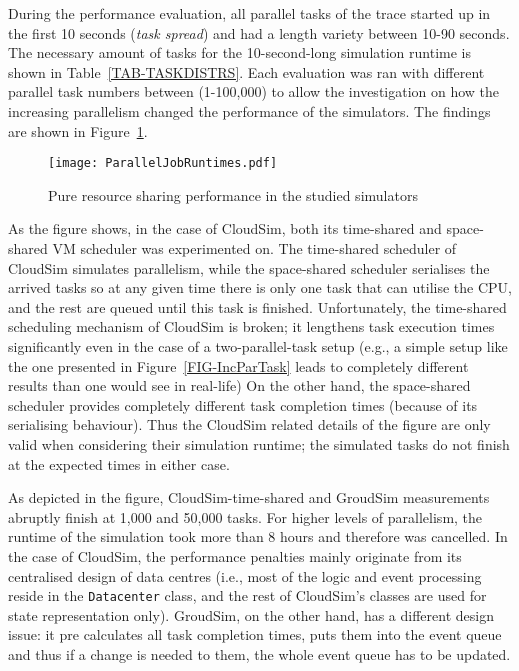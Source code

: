\documentclass[sort, compress, 5p]{elsarticle}
\begin{document}
During the performance evaluation, all parallel tasks of the trace started up in the first 10 seconds (\emph{task spread}) and had a length variety between 10-90 seconds. The necessary amount of tasks for the 10-second-long simulation runtime is shown in Table~\ref{TAB-TASKDISTRS}. Each evaluation was ran with different parallel task numbers between (1-100,000) to allow the investigation on how the increasing parallelism changed the performance of the simulators. The findings are shown in Figure~\ref{FIG-PJRuntime}.

\begin{figure}[tb]
\center
\texttt{[image: ParallelJobRuntimes.pdf]}
\caption{Pure resource sharing performance in the studied simulators\label{FIG-PJRuntime}}
\end{figure}

As the figure shows, in the case of CloudSim, both its time-shared and space-shared VM scheduler was experimented on. The time-shared scheduler of CloudSim simulates parallelism, while the space-shared scheduler serialises the arrived tasks so at any given time there is only one task that can utilise the CPU, and the rest are queued until this task is finished. Unfortunately, the time-shared scheduling mechanism of CloudSim is broken; it lengthens task execution times significantly even in the case of a two-parallel-task setup (e.g., a simple setup like the one presented in Figure~\ref{FIG-IncParTask} leads to completely different results than one would see in real-life) On the other hand, the space-shared scheduler provides completely different task completion times (because of its serialising behaviour). Thus the CloudSim related details of the figure are only valid when considering their simulation runtime; the simulated tasks do not finish at the expected times in either case.

As depicted in the figure, CloudSim-time-shared and GroudSim measurements abruptly finish at 1,000 and 50,000 tasks. For higher levels of parallelism, the runtime of the simulation took more than 8 hours and therefore was cancelled. In the case of CloudSim, the performance penalties mainly originate from its centralised design of data centres (i.e., most of the logic and event processing reside in the \verb+Datacenter+ class, and the rest of CloudSim's classes are used for state representation only). GroudSim, on the other hand, has a different design issue: it pre calculates all task completion times, puts them into the event queue and thus if a change is needed to them, the whole event queue has to be updated.
\end{document}
